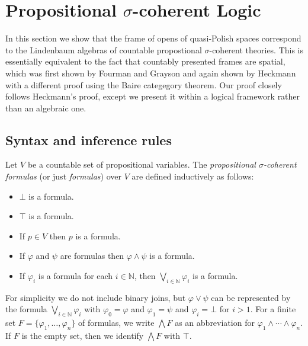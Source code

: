 \documentclass{article}
\theoremstyle{plain}
\def\IN{{\mathbb N}}
\begin{document}
\section{Propositional $\sigma$-coherent Logic}

In this section we show that the frame of opens of quasi-Polish spaces correspond to the Lindenbaum algebras of countable propostional $\sigma$-coherent theories. This is essentially equivalent to the fact that countably presented frames are spatial, which was first shown by Fourman and Grayson \cite{FG82} and again shown by Heckmann \cite{H15} with a different proof using the Baire categegory theorem. Our proof closely follows Heckmann's proof, except we present it within a logical framework rather than an algebraic one.

\subsection{Syntax and inference rules}

Let $V$ be a countable set of propositional variables. The \emph{propositional $\sigma$-coherent formulas} (or just \emph{formulas}) over $V$ are defined inductively as follows:
\begin{itemize}
\item
$\bot$  is a formula.
\item
$\top$ is a formula.
\item
If $p\in V$ then $p$ is a formula.
\item
If $\varphi$ and $\psi$ are formulas then $\varphi\wedge \psi$ is a formula.
\item
If $\varphi_i$ is a formula for each $i\in \IN$, then $\bigvee_{i\in \IN} \varphi_i$ is a formula.
\end{itemize}
For simplicity we do not include binary joins, but $\varphi\vee\psi$ can be represented by the formula $\bigvee_{i\in\IN} \varphi_i$ with $\varphi_0 = \varphi$ and $\varphi_1 = \psi$ and $\varphi_i = \bot$ for $i>1$. For a finite set $F=\{\varphi_1,\ldots,\varphi_n\}$ of formulas, we write $\bigwedge F$ as an abbreviation for $\varphi_1 \wedge \cdots \wedge \varphi_n$. If $F$ is the empty set, then we identify $\bigwedge F$ with $\top$.
\end{document}
